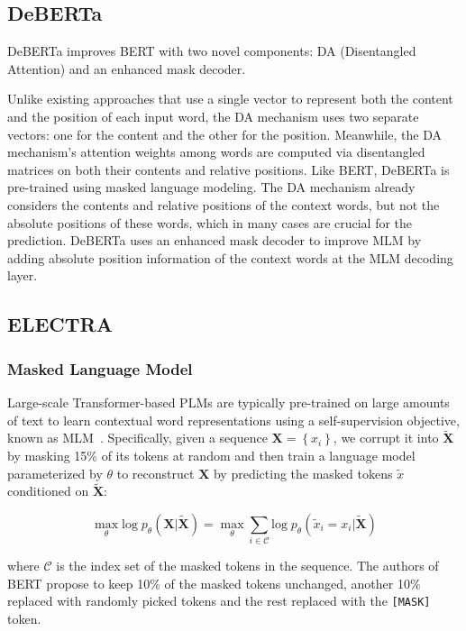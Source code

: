 \subsection{DeBERTa} 
DeBERTa improves BERT with two novel components: DA (Disentangled Attention) and an enhanced mask decoder. 

Unlike existing approaches that use a single vector to represent both the content and the position of each input word, the DA mechanism uses two separate vectors: one for the content and the other for the position. Meanwhile, the DA mechanism's attention weights among words are computed via disentangled matrices on both their contents and relative positions. Like BERT, DeBERTa is pre-trained using masked language modeling.  The DA mechanism already considers the contents and relative positions of the context words, but not the absolute positions of these words, which in many cases are crucial for the prediction. DeBERTa uses an enhanced mask decoder to improve MLM by adding absolute position information of the context words at the MLM decoding layer.

\subsection{ELECTRA}
\subsubsection{Masked Language Model} Large-scale Transformer-based PLMs are typically pre-trained on large amounts of text to learn contextual word representations using a self-supervision objective, known as MLM~\citep{devlin2018bert}. Specifically, given a sequence $\bm{X}=\left\{x_i \right\}$, we corrupt it into $\bm{\tilde{X}}$ by masking 15\% of its tokens at random and then train a language model parameterized by $\theta$ to reconstruct $\bm{X}$ by predicting the masked tokens $\tilde{x}$ conditioned on $\bm{\tilde{X}}$:

\begin{equation}
\label{mlm}

\max_{\theta} \text{log} \; p_{\theta}(\bm{X}|\bm{\tilde{X}}) = \max_{\theta} \sum_{i\in \mathcal{C}}{\text{log} \;  p_{\theta}(\tilde{x}_i=x_i|\bm{\tilde{X}})}

\end{equation}

where $\mathcal{C}$ is the index set of the masked tokens in the sequence. The authors of BERT propose to keep 10\% of the masked tokens unchanged, another 10\% replaced with randomly picked tokens and the rest replaced with the \texttt{[MASK]} token.

